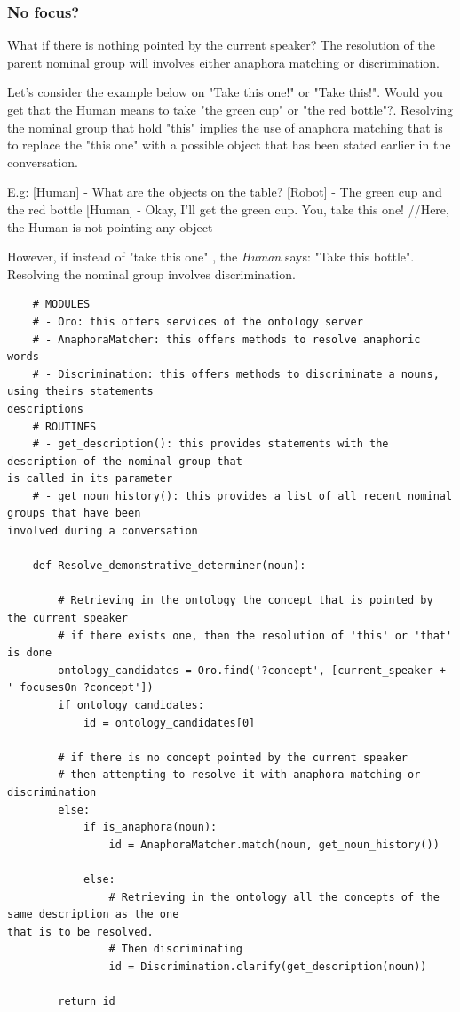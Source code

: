 \documentclass[twoside,a4paper,10pt]{report}
\begin{document}
\subsubsection{No focus?}
What if there is nothing pointed by the current speaker? The resolution of the parent nominal group will involves either anaphora matching or discrimination.

Let's consider the example below on "Take this one!" or "Take this!".
Would you get that the Human means to take "the green cup" or "the red bottle"?. 
Resolving the nominal group that hold "this" implies the use of anaphora matching that is to replace the "this one" with a possible object that has been stated earlier in the conversation.



\small
\begin{verbatimtab}
  E.g: 
  [Human] - What are the objects on the table?
  [Robot] - The green cup and the red bottle
  [Human] - Okay, I'll get the green cup. You, take this one! //Here, the Human is not pointing any
object
\end{verbatimtab}
\normalsize

However, if instead of "take this one" , the \textsl{Human} says: "Take this bottle". Resolving the nominal group involves discrimination. 


\lstset{language=python}
\begin{lstlisting}
    # MODULES
    # - Oro: this offers services of the ontology server
    # - AnaphoraMatcher: this offers methods to resolve anaphoric words
    # - Discrimination: this offers methods to discriminate a nouns, using theirs statements
descriptions
    # ROUTINES
    # - get_description(): this provides statements with the description of the nominal group that
is called in its parameter
    # - get_noun_history(): this provides a list of all recent nominal groups that have been
involved during a conversation 
    
    def Resolve_demonstrative_determiner(noun):
        
        # Retrieving in the ontology the concept that is pointed by the current speaker
        # if there exists one, then the resolution of 'this' or 'that' is done
        ontology_candidates = Oro.find('?concept', [current_speaker + ' focusesOn ?concept'])
        if ontology_candidates:
            id = ontology_candidates[0]
        
        # if there is no concept pointed by the current speaker
        # then attempting to resolve it with anaphora matching or discrimination
        else:
            if is_anaphora(noun):
                id = AnaphoraMatcher.match(noun, get_noun_history())
                
            else:
                # Retrieving in the ontology all the concepts of the same description as the one
that is to be resolved.
                # Then discriminating
                id = Discrimination.clarify(get_description(noun))
                    
        return id

\end{lstlisting}
\end{document}
